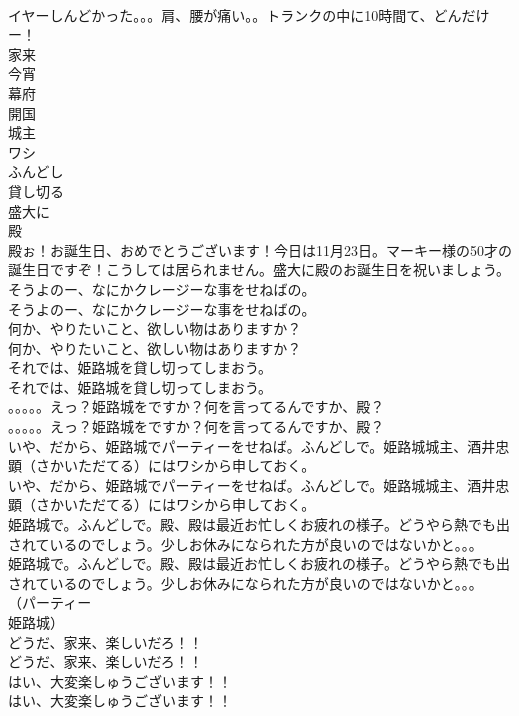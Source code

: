 \documentclass[8pt]{extreport}
\begin{document}
\begin{CJK}{UTF8}{min}
\\	イヤーしんどかった。。。肩、腰が痛い。。トランクの中に10時間て、どんだけー！ 
\\	家来
\\	今宵
\\	幕府
\\	開国
\\	城主
\\	ワシ
\\	ふんどし
\\	貸し切る
\\	盛大に
\\	殿
\\	殿ぉ！お誕生日、おめでとうございます！今日は11月23日。マーキー様の50才の誕生日ですぞ！こうしては居られません。盛大に殿のお誕生日を祝いましょう。	
\\	そうよのー、なにかクレージーな事をせねばの。	
\\	そうよのー、なにかクレージーな事をせねばの。 
\\	何か、やりたいこと、欲しい物はありますか？	
\\	何か、やりたいこと、欲しい物はありますか？ 
\\	それでは、姫路城を貸し切ってしまおう。	
\\	それでは、姫路城を貸し切ってしまおう。 
\\	。。。。。えっ？姫路城をですか？何を言ってるんですか、殿？	
\\	。。。。。えっ？姫路城をですか？何を言ってるんですか、殿？ 
\\	いや、だから、姫路城でパーティーをせねば。ふんどしで。姫路城城主、酒井忠顕（さかいただてる）にはワシから申しておく。	
\\	いや、だから、姫路城でパーティーをせねば。ふんどしで。姫路城城主、酒井忠顕（さかいただてる）にはワシから申しておく。 
\\	姫路城で。ふんどしで。殿、殿は最近お忙しくお疲れの様子。どうやら熱でも出されているのでしょう。少しお休みになられた方が良いのではないかと。。。	
\\	姫路城で。ふんどしで。殿、殿は最近お忙しくお疲れの様子。どうやら熱でも出されているのでしょう。少しお休みになられた方が良いのではないかと。。。 
\\	（パーティー 
\\	姫路城）	
\\	どうだ、家来、楽しいだろ！！	
\\	どうだ、家来、楽しいだろ！！ 
\\	はい、大変楽しゅうございます！！	
\\	はい、大変楽しゅうございます！！ 

\end{CJK}
\end{document}
